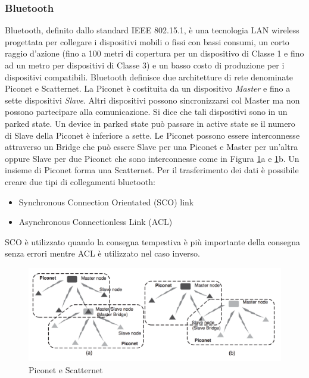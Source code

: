 \subsubsection{Bluetooth}
Bluetooth, definito dallo standard IEEE 802.15.1, è una tecnologia LAN wireless progettata per collegare i dispositivi mobili o fissi con bassi consumi, un corto raggio d'azione (fino a 100 metri di copertura per un dispositivo di Classe 1 e fino ad un metro per dispositivi di Classe 3) e un basso costo di produzione per i dispositivi compatibili. 
Bluetooth definisce due architetture di rete denominate Piconet e Scatternet. La Piconet è costituita da un dispositivo \emph{Master} e fino a sette dispositivi \emph{Slave}. Altri dispositivi possono sincronizzarsi col Master ma non possono partecipare alla comunicazione. Si dice che tali dispositivi sono in un parked state. Un device in parked state può passare in active state se il numero di Slave della Piconet è inferiore a sette. Le Piconet possono essere interconnesse attraverso un Bridge che può essere Slave per una Piconet e Master per un'altra oppure Slave per due Piconet che sono interconnesse come in Figura \ref{fig:bt}a e \ref{fig:bt}b. Un insieme di Piconet forma una Scatternet.\newpage
Per il trasferimento dei dati è possibile creare due tipi di collegamenti bluetooth:
\begin{itemize}
		\item Synchronous Connection Orientated (SCO) link
		\item Asynchronous Connectionless Link (ACL)
\end{itemize}
SCO è utilizzato quando la consegna tempestiva è più importante della consegna senza errori mentre ACL è utilizzato nel caso inverso.
\begin{figure}[h]
	\centering
	\includegraphics[scale=0.350]{imgs/bt.png}
	\caption{Piconet e Scatternet} \label{fig:bt}
\end{figure}
